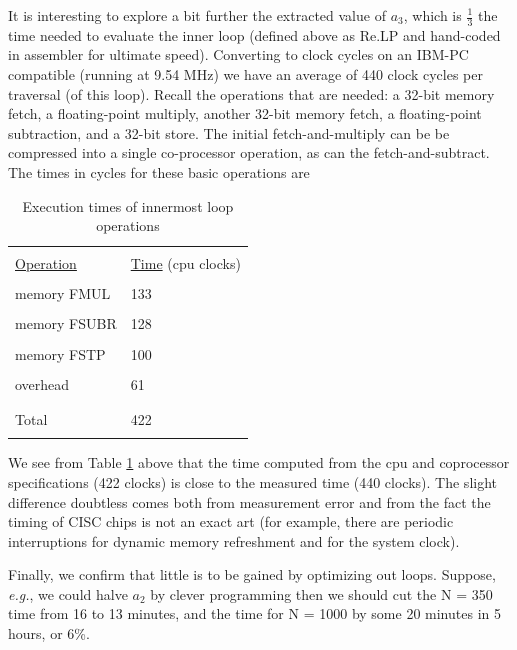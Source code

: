 It is interesting to explore a bit further the extracted value of $a_3$, which is $\frac{1}{3}$ the time needed to evaluate the inner loop (defined above as Re.LP and hand-coded in assembler for ultimate speed). Converting to clock cycles on an IBM-PC compatible (running at 9.54 MHz) we have an average of 440 clock cycles per traversal (of this loop). Recall the operations that are needed: a 32-bit memory fetch, a floating-point multiply, another 32-bit memory fetch, a floating-point subtraction, and a 32-bit store. The initial fetch-and-multiply can be be compressed into a single co-processor operation, as can the fetch-and-subtract. The times in cycles for these basic operations are
\begin{table}
    \centering
    \caption{Execution times of innermost loop operations}
        \bigskip
    \label{tbl:09_02} 
    \setlength{\tabcolsep}{10pt}
        \begin{tabular}{|ll|}
            \hline &  \\
            \underline{Operation} & \underline{Time} \; (cpu clocks)\\
            &  \\
            memory FMUL &  133  \\
            &  \\
            memory FSUBR &  128  \\
            &  \\
            memory FSTP &  100  \\ 
            &  \\
            overhead &  61  \\ 
            &  \\
            \hline &  \\
            Total &  422  \\ 
            &  \\
            \hline
        \end{tabular}
\end{table}

We see from Table \ref{tbl:09_02} above that the time computed from the cpu and coprocessor specifications (422 clocks) is close to the measured time (440 clocks). The slight difference doubtless comes both from measurement error and from the fact the timing of CISC chips is not an exact art (for example, there are periodic interruptions for dynamic memory refreshment and for the system clock).

Finally, we confirm that little is to be gained by optimizing out loops. Suppose, \textit{e.g.}, we could halve $a_2$ by clever programming then we should cut the N = 350 time from 16 to 13 minutes, and the time for N = 1000 by some 20 minutes in 5 hours, or 6\%.

